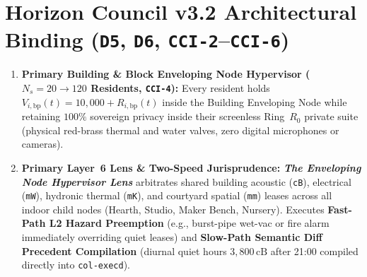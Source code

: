 \section{Horizon Council v3.2 Architectural Binding (\texttt{D5}, \texttt{D6}, \texttt{CCI-2}--\texttt{CCI-6})}
\begin{enumerate}
    \item \textbf{Primary Building \& Block Enveloping Node Hypervisor ($N_s = 20 \to 120$ Residents, \texttt{CCI-4}):} Every resident holds $V_{i,\mathrm{bp}}(t) = 10{,}000 + R_{i,\mathrm{bp}}(t)$ inside the Building Enveloping Node while retaining $100\%$ sovereign privacy inside their screenless Ring~$R_0$ private suite (physical red-brass thermal and water valves, zero digital microphones or cameras).
    \item \textbf{Primary Layer~6 Lens \& Two-Speed Jurisprudence:} \textbf{\textit{The Enveloping Node Hypervisor Lens}} arbitrates shared building acoustic (\texttt{cB}), electrical (\texttt{mW}), hydronic thermal (\texttt{mK}), and courtyard spatial (\texttt{mm}) leases across all indoor child nodes (Hearth, Studio, Maker Bench, Nursery). Executes \textbf{Fast-Path L2 Hazard Preemption} (e.g., burst-pipe wet-vac or fire alarm immediately overriding quiet leases) and \textbf{Slow-Path Semantic Diff Precedent Compilation} (diurnal quiet hours $3{,}800\,\mathrm{cB}$ after 21:00 compiled directly into \texttt{col-execd}).
\end{enumerate}

